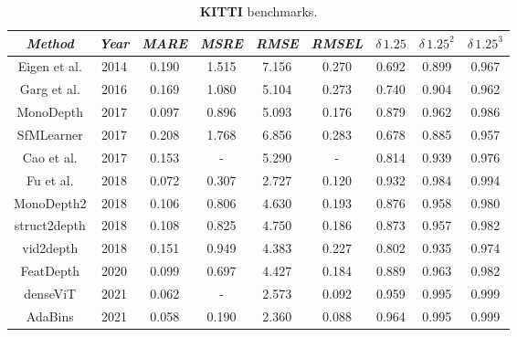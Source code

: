 \begin{table}
	\begin{adjustwidth}{-0.2\textwidth}{-0.2\textwidth}
	\centering
	\begin{tabular}{c|c|c|c|c|c|c|c|c}
		\emph{Method} & \emph{Year} & \emph{MARE} & \emph{MSRE} & \emph{RMSE} & \emph{RMSEL} & \emph{$\delta \, 1.25$} & \emph{$\delta \, 1.25^{2}$} & \emph{$\delta \, 1.25^{3}$} \\
		\hline
		Eigen et al. \cite{Eigen}                  & 2014 & 0.190 & 1.515 & 7.156 & 0.270 & 0.692 & 0.899 & 0.967 \\
		Garg et al. \cite{Garg}                    & 2016 & 0.169 & 1.080 & 5.104 & 0.273 & 0.740 & 0.904 & 0.962 \\
		MonoDepth \cite{MonoDepth}                 & 2017 & 0.097 & 0.896 & 5.093 & 0.176 & 0.879 & 0.962 & 0.986 \\
		SfMLearner \cite{SfMLearner}               & 2017 & 0.208 & 1.768 & 6.856 & 0.283 & 0.678 & 0.885 & 0.957 \\
		Cao et al. \cite{depth_as_classification}  & 2017 & 0.153 &   -   & 5.290 &   -   & 0.814 & 0.939 & 0.976 \\
		Fu et al. \cite{ordinal_regression}        & 2018 & 0.072 & 0.307 & 2.727 & 0.120 & 0.932 & 0.984 & 0.994 \\
		MonoDepth2 \cite{MonoDepth2}               & 2018 & 0.106 & 0.806 & 4.630 & 0.193 & 0.876 & 0.958 & 0.980 \\
		struct2depth \cite{struct2depth}           & 2018 & 0.108 & 0.825 & 4.750 & 0.186 & 0.873 & 0.957 & 0.982 \\
		vid2depth \cite{vid2depth}                 & 2018 & 0.151 & 0.949 & 4.383 & 0.227 & 0.802 & 0.935 & 0.974 \\
		FeatDepth \cite{FeatDepth}                 & 2020 & 0.099 & 0.697 & 4.427 & 0.184 & 0.889 & 0.963 & 0.982 \\
		denseViT \cite{denseViT}                   & 2021 & 0.062 &   -   & 2.573 & 0.092 & 0.959 & 0.995 & 0.999 \\
		AdaBins \cite{AdaBins}                     & 2021 & 0.058 & 0.190 & 2.360 & 0.088 & 0.964 & 0.995 & 0.999 \\
	\end{tabular}
\end{adjustwidth}
	\caption{
		\textbf{KITTI} benchmarks.
		\label{t:kitti_benchmarks}
	}
\end{table}

